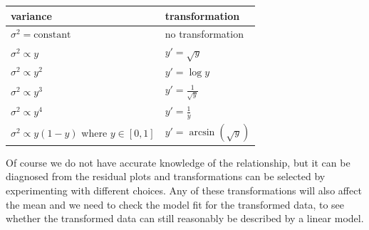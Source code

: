 \documentclass[
  a4paper,
]{article}
\theoremstyle{definition}
\theoremstyle{definition}
\theoremstyle{definition}
\theoremstyle{definition}
\theoremstyle{remark}
\begin{document}
{\def\LTcaptype{} %
\begin{longtable}[]{@{}
  >{\raggedright\arraybackslash}p{}
  >{\raggedright\arraybackslash}p{}@{}}
\toprule\noalign{}
\begin{minipage}[b]{\linewidth}\raggedright
variance
\end{minipage} & \begin{minipage}[b]{\linewidth}\raggedright
transformation
\end{minipage} \\
\midrule\noalign{}
\endhead
\bottomrule\noalign{}
\endlastfoot
\(\sigma^2 = \text{constant}\) & no transformation \\
\(\sigma^2 \propto y\) & \(y' = \sqrt{y}\) \\
\(\sigma^2 \propto y^2\) & \(y' = \log y\) \\
\(\sigma^2 \propto y^3\) & \(y' = \frac{1}{\sqrt{y}}\) \\
\(\sigma^2 \propto y^4\) & \(y' = \frac{1}{y}\) \\
\(\sigma^2 \propto y(1-y)\) where \(y \in [0,1]\) & \(y' = \arcsin(\sqrt{y})\) \\
\end{longtable}
}

Of course we do not have accurate knowledge of the relationship, but it can be
diagnosed from the residual plots and transformations can be selected by
experimenting with different choices. Any of these transformations will also
affect the mean and we need to check the model fit for the transformed data, to
see whether the transformed data can still reasonably be described by a linear
model.
\end{document}
